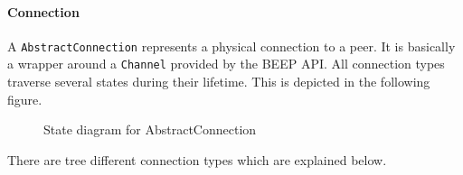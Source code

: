\paragraph{Connection}
A \texttt{AbstractConnection} represents a physical connection to a peer. It is basically a wrapper around a \texttt{Channel} provided by the BEEP API. All connection types traverse several states during their lifetime. This is depicted in the following figure.

\begin{figure}[H]
 \centering
 \caption{State diagram for AbstractConnection}
 \label{fig:network.discovery.connection.state}
\end{figure}

There are tree different connection types which are explained below.

